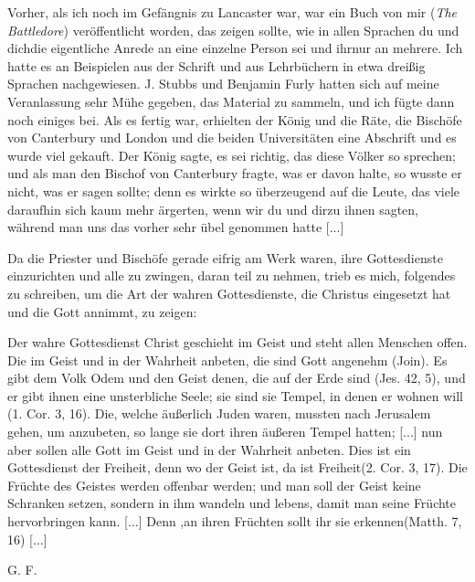 Vorher, als ich noch im Gefängnis zu Lancaster war, war
ein Buch von mir (\textit{The Battledore}) veröffentlicht 
worden, das zeigen sollte, wie in allen Sprachen \glqq du\grqq 
und \glqq dich\grqq die eigentliche Anrede an eine einzelne 
Person sei und \glqq ihr\grqq nur an mehrere.
Ich hatte es an Beispielen aus der Schrift und aus Lehrbüchern
in etwa dreißig Sprachen nachgewiesen. J. Stubbs und Benjamin
Furly hatten sich auf meine Veranlassung sehr Mühe gegeben,
das Material zu sammeln, und ich fügte dann noch einiges bei.
Als es fertig war, erhielten der König und die Räte, die Bischöfe
von Canterbury und London und die beiden Universitäten eine
Abschrift und es wurde viel gekauft. Der König sagte, es sei
richtig, das diese Völker so sprechen; und als man den Bischof
von Canterbury fragte, was er davon halte, so wusste er nicht,
was er sagen sollte; denn es wirkte so überzeugend auf die Leute,
das viele daraufhin sich kaum mehr ärgerten, wenn wir \glqq du\grqq
und \glqq dir\grqq zu ihnen sagten, während man uns das vorher sehr
übel genommen hatte [...]

Da die Priester und Bischöfe gerade eifrig am Werk waren,
ihre Gottesdienste einzurichten und alle zu zwingen, daran teil
zu nehmen, trieb es mich, folgendes zu schreiben, um die Art der
wahren Gottesdienste, die Christus eingesetzt hat und die Gott
annimmt, zu zeigen:

\glqq Der wahre Gottesdienst Christ geschieht im Geist und steht
allen Menschen offen. Die im Geist und in der Wahrheit anbeten, 
die sind Gott angenehm (Join). Es gibt dem Volk Odem
und den Geist denen, die auf der Erde sind (Jes. 42, 5), und er
gibt ihnen eine unsterbliche Seele; sie sind sie Tempel, in denen
er wohnen will (1. Cor. 3, 16). Die, welche äußerlich
Juden waren, mussten nach Jerusalem gehen, um anzubeten, so
lange sie dort ihren äußeren Tempel hatten; [...] nun aber
sollen alle \glqq Gott im Geist und in der Wahrheit anbeten\grqq. Dies
ist ein Gottesdienst der Freiheit, denn \glqq wo der Geist ist, da ist
Freiheit\grqq (2. Cor. 3, 17). Die Früchte des Geistes werden
offenbar werden; und man soll der Geist keine Schranken setzen,
sondern in ihm wandeln und lebens, damit man seine Früchte
hervorbringen kann. [...] Denn ,an ihren Früchten sollt ihr
sie erkennen\grqq (Matth. 7, 16) [...] 
 \begin{flushright}G. F. \end{flushright}


